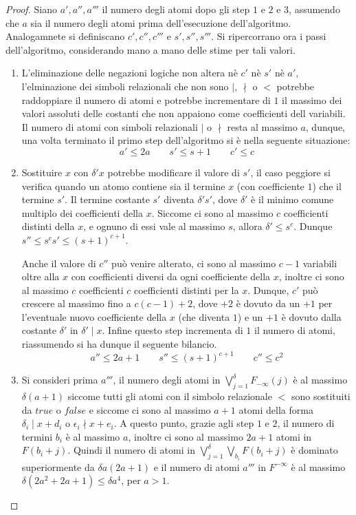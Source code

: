 \documentclass[11pt,letterpaper,twoside]{article}
\begin{document}
\begin{proof}
  Siano $a', a'', a'''$ il numero degli atomi dopo gli step $1$ e $2$ e $3$,
  assumendo che $a$ sia il numero degli atomi prima dell'esecuzione
  dell'algoritmo.
  Analogamnete si definiscano $c', c'', c'''$ e $s', s'', s'''$. Si ripercorrano
  ora i passi dell'algoritmo, considerando mano a mano delle stime per tali
  valori.
  \begin{enumerate}[label=Step \arabic*.]
  \item L'eliminazione delle negazioni logiche non altera nè $c'$ nè $s'$ nè
    $a'$, l'elminazione dei simboli relazionali che non sono $\mid$, $\nmid$ o
    $<$ potrebbe raddoppiare il numero di atomi e potrebbe incrementare di $1$
    il massimo dei valori assoluti delle costanti che non appaiono come
    coefficienti dell variabili.
    Il numero di atomi con simboli relazionali $\mid$ o $\nmid$ resta al massimo
    $a$, dunque, una volta terminato il primo step dell'algoritmo si è nella
    seguente situazione:
    $$ a' \le 2a \qquad s' \le s + 1 \qquad c' \le c $$
  \item Sostituire $x$ con $\delta' x$ potrebbe modificare il valore di $s'$, il
    caso peggiore si verifica quando un atomo contiene sia il termine $x$ (con
    coefficiente $1$) che il termine $s'$. Il termine costante $s'$ diventa
    $\delta' s'$, dove $\delta'$ è il minimo comune multiplo dei coefficienti
    della $x$. Siccome ci sono al massimo $c$ coefficienti distinti della $x$, e
    ognuno di essi vale al massimo $s$, allora $\delta' \le s^c$.
    Dunque $s'' \le s^cs' \le (s+1)^{c+1}$.
    
    Anche il valore di $c''$ può venire alterato, ci sono al massimo $c-1$
    variabili oltre alla $x$ con coefficienti diversi da ogni coefficiente della
    $x$, inoltre ci sono al massimo $c$ coefficienti $c$ coefficienti distinti
    per la $x$. Dunque, $c'$ può crescere al massimo fino a $c(c-1)+2$, dove
    $+2$ è dovuto da un $+1$ per l'eventuale nuovo coefficiente della $x$ (che
    diventa $1$) e un $+1$ è dovuto dalla costante $\delta'$ in $\delta' \mid
    x$. Infine questo step incrementa di $1$ il numero di atomi, riassumendo si
    ha dunque il seguente bilancio.
    $$ a'' \le 2a + 1 \qquad s'' \le (s+1)^{c+1} \qquad c'' \le c^2$$

  \item Si consideri prima $a'''$, il numero degli atomi in
    $\bigvee_{j=1}^\delta F_{-\infty}(j)$ è al massimo $\delta (a+1)$ siccome
    tutti gli atomi con il simbolo relazionale $<$ sono sostituiti da $true$ o
    $false$ e siccome ci sono al massimo $a+1$ atomi della forma $\delta_i \mid
    x + d_i$ o $\epsilon_i \nmid x + e_i$. A questo punto, grazie agli step $1$
    e $2$, il numero di termini $b_i$ è al massimo $a$, inoltre ci sono al
    massimo $2a + 1$ atomi in $F(b_i + j)$. Quindi il numero di atomi in
    $\bigvee_{j=1}^\delta \bigvee_{b_i} F(b_i + j)$ è dominato superiormente da
    $\delta a (2a + 1)$ e il numero di atomi $a'''$ in $F^{-\infty}$ è al
    massimo $\delta (2a^2 +2a +1) \le \delta a^4$, per $a > 1$.


\end{enumerate}
\end{proof}
\end{document}

